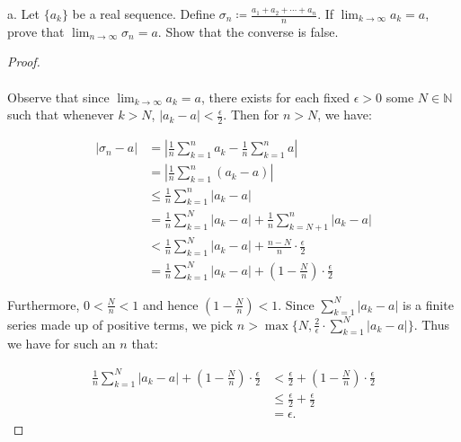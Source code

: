 a.  Let $\{a_k\}$ be a real sequence. Define
    $\sigma_n \coloneqq \frac{a_1 + a_2 + \cdots + a_n}{n}$. If 
    $\lim_{k \rightarrow \infty}{a_k} = a$, prove that
     $\lim_{n \rightarrow \infty}{\sigma_n} = a$.  Show that the converse is
    false.

    \begin{proof}\ \\\\

        Observe that since $\lim_{k \rightarrow \infty}{a_k} = a$, there exists
        for each fixed $\epsilon > 0$ some $N \in \mathbb{N}$ such that
        whenever $k > N$, $|a_k - a| < \frac{\epsilon}{2}$. Then for
        $n > N$, we have:

        \begin{align*}
            |\sigma_n - a|
             &= \left|\frac{1}{n}\sum\limits_{k=1}^{n}{a_k} - \frac{1}{n}\sum\limits_{k=1}^{n}{a} \right| \\
             &= \left|\frac{1}{n}\sum\limits_{k=1}^{n}{\left(a_k - a\right)} \right| \\
             &\le \frac{1}{n}\sum\limits_{k=1}^{n}{|a_k - a|} \\
             &= \frac{1}{n}\sum\limits_{k=1}^{N}{|a_k - a|} + \frac{1}{n}\sum\limits_{k=N+1}^{n}{|a_k - a|} \\
             &< \frac{1}{n}\sum\limits_{k=1}^{N}{|a_k - a|} + \frac{n - N}{n} \cdot \frac{\epsilon}{2} \\
             &= \frac{1}{n}\sum\limits_{k=1}^{N}{|a_k - a|} + \left(1 - \frac{N}{n}\right) \cdot \frac{\epsilon}{2}
        \end{align*}

        Furthermore, $0 < \frac{N}{n} < 1$ and hence 
        $\left(1 - \frac{N}{n}\right) < 1$. Since 
        $\sum\limits_{k=1}^{N}{|a_k - a|}$ is a finite series made up of
        positive terms, we pick
        $n > \max{\{N, \frac{2}{\epsilon} \cdot \sum\limits_{k=1}^{N}{|a_k - a|}\}}$.
        Thus we have for such an $n$ that:

        \begin{align*}
            \frac{1}{n}\sum\limits_{k=1}^{N}{|a_k - a|} + \left(1 - \frac{N}{n}\right) \cdot \frac{\epsilon}{2}
              &< \frac{\epsilon}{2} + \left(1 - \frac{N}{n}\right) \cdot \frac{\epsilon}{2} \\
              &\le \frac{\epsilon}{2} + \frac{\epsilon}{2} \\
              &= \epsilon.
        \end{align*}


\end{proof}
